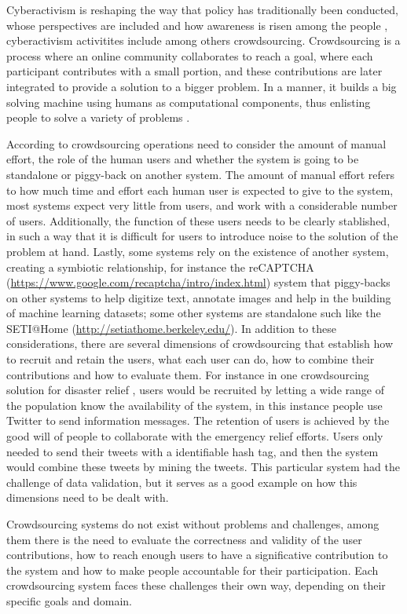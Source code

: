 \documentclass[a4paper,10pt]{article}
\begin{document}
Cyberactivism is reshaping the way that policy has traditionally been conducted, whose perspectives are included and how awareness is risen among the people \citep{milan2013}, cyberactivism activitites include among others crowdsourcing. Crowdsourcing is a process where an online community collaborates to reach a goal, where each participant contributes with a small portion, and these contributions are later integrated to provide a solution to a bigger problem. In a manner, it builds a big solving machine using humans as computational components, thus enlisting people to solve a variety of problems \citep{doan2011}.

According to \cite{doan2011} crowdsourcing operations need to consider the amount of manual effort, the role of the human users and whether the system is going to be standalone or piggy-back on another system. The amount of manual effort refers to how much time and effort each human user is expected to give to the system, most systems expect very little from users, and work with a considerable number of users. Additionally, the function of these users needs to be clearly stablished, in such a way that it is difficult for users to introduce noise to the solution of the problem at hand. Lastly, some systems rely on the existence of another system, creating a symbiotic relationship, for instance the reCAPTCHA (\url{https://www.google.com/recaptcha/intro/index.html}) system that piggy-backs on other systems to help digitize text, annotate images and help in the building of machine learning datasets; some other systems are standalone such like the SETI@Home (\url{http://setiathome.berkeley.edu/}). In addition to these considerations, there are several dimensions of crowdsourcing that establish how to recruit and retain the users, what each user can do, how to combine their contributions and how to evaluate them. For instance in one crowdsourcing solution for disaster relief \citep{gao2011}, users would be recruited by letting a wide range of the population know the availability of the system, in this instance people use Twitter to send information messages. The retention of users is achieved by the good will of people to collaborate with the emergency relief efforts. Users only needed to send their tweets with a identifiable hash tag, and then the system would combine these tweets by mining the tweets. This particular system had the challenge of data validation, but it serves as a good example on how this dimensions need to be dealt with.

Crowdsourcing systems do not exist without problems and challenges, among them there is the need to evaluate the correctness and validity of the user contributions, how to reach enough users to have a significative contribution to the system and how to make people accountable for their participation. Each crowdsourcing system faces these challenges their own way, depending on their specific goals and domain.
\end{document}
